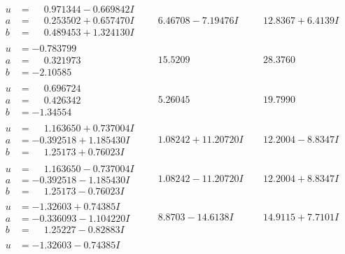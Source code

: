 \documentclass[1p]{elsarticle_modified}
\theoremstyle{definition}
\begin{document}
$$\begin{array}{c|c|c}
\begin{aligned}
u &= \phantom{-}0.971344 - 0.669842 I \\
a &= \phantom{-}0.253502 + 0.657470 I \\
b &= \phantom{-}0.489453 + 1.324130 I\end{aligned}
 & \phantom{-}6.46708 - 7.19476 I & \phantom{-}12.8367 + 6.4139 I \\ \hline\begin{aligned}
u &= -0.783799\phantom{ +0.000000I} \\
a &= \phantom{-}0.321973\phantom{ +0.000000I} \\
b &= -2.10585\phantom{ +0.000000I}\end{aligned}
 & \phantom{-}15.5209\phantom{ +0.000000I} & \phantom{-}28.3760\phantom{ +0.000000I} \\ \hline\begin{aligned}
u &= \phantom{-}0.696724\phantom{ +0.000000I} \\
a &= \phantom{-}0.426342\phantom{ +0.000000I} \\
b &= -1.34554\phantom{ +0.000000I}\end{aligned}
 & \phantom{-}5.26045\phantom{ +0.000000I} & \phantom{-}19.7990\phantom{ +0.000000I} \\ \hline\begin{aligned}
u &= \phantom{-}1.163650 + 0.737004 I \\
a &= -0.392518 + 1.185430 I \\
b &= \phantom{-}1.25173 + 0.76023 I\end{aligned}
 & \phantom{-}1.08242 + 11.20720 I & \phantom{-}12.2004 - 8.8347 I \\ \hline\begin{aligned}
u &= \phantom{-}1.163650 - 0.737004 I \\
a &= -0.392518 - 1.185430 I \\
b &= \phantom{-}1.25173 - 0.76023 I\end{aligned}
 & \phantom{-}1.08242 - 11.20720 I & \phantom{-}12.2004 + 8.8347 I \\ \hline\begin{aligned}
u &= -1.32603 + 0.74385 I \\
a &= -0.336093 - 1.104220 I \\
b &= \phantom{-}1.25227 - 0.82883 I\end{aligned}
 & \phantom{-}8.8703 - 14.6138 I & \phantom{-}14.9115 + 7.7101 I \\ \hline\begin{aligned}
u &= -1.32603 - 0.74385 I \\

\end{aligned}
\end{array}$$
\end{document}
